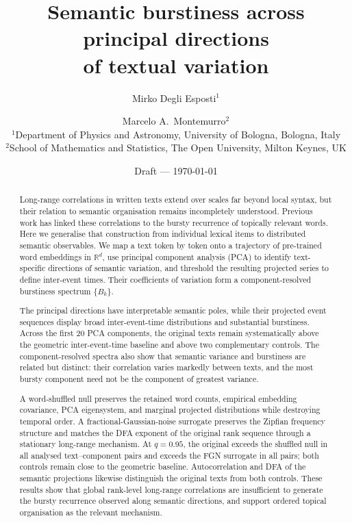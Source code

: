\documentclass[12pt,a4paper]{article}
\newcommand{\R}{\mathbb{R}}
\begin{document}
\title{Semantic burstiness across principal directions\\
       of textual variation}

\author{Mirko Degli Esposti$^{1}$ \and Marcelo A.\ Montemurro$^{2}$\\[6pt]
  \small $^1$Department of Physics and Astronomy,
         University of Bologna, Bologna, Italy\\
  \small $^2$School of Mathematics and Statistics,
         The Open University, Milton Keynes, UK}

\date{\small Draft --- \today}

\maketitle

\begin{abstract}
Long-range correlations in written texts extend over scales far beyond
local syntax, but their relation to semantic organisation remains
incompletely understood.
Previous work has linked these correlations to the bursty recurrence of
topically relevant words.
Here we generalise that construction from individual lexical items to
distributed semantic observables.
We map a text token by token onto a trajectory of pre-trained word
embeddings in $\R^d$, use principal component analysis (PCA) to identify
text-specific directions of semantic variation, and threshold the
resulting projected series to define inter-event times.
Their coefficients of variation form a component-resolved burstiness
spectrum $\{B_k\}$.

The principal directions have interpretable semantic poles, while their
projected event sequences display broad inter-event-time distributions
and substantial burstiness.
Across the first 20 PCA components, the original texts remain
systematically above the geometric inter-event-time baseline and above
two complementary controls.
The component-resolved spectra also show that semantic variance and
burstiness are related but distinct: their correlation varies markedly
between texts, and the most bursty component need not be the component
of greatest variance.

A word-shuffled null preserves the retained word counts, empirical
embedding covariance, PCA eigensystem, and marginal projected
distributions while destroying temporal order.
A fractional-Gaussian-noise surrogate preserves the Zipfian frequency
structure and matches the DFA exponent of the original rank sequence
through a stationary long-range mechanism.
At $q=0.95$, the original exceeds the shuffled null in all analysed
text--component pairs and exceeds the FGN surrogate in all
pairs; both controls remain close to the geometric baseline.
Autocorrelation and DFA of the semantic projections likewise distinguish
the original texts from both controls.
These results show that global rank-level long-range correlations are
insufficient to generate the bursty recurrence observed along semantic
directions, and support ordered topical organisation as the relevant
mechanism.
\end{abstract}
\end{document}

